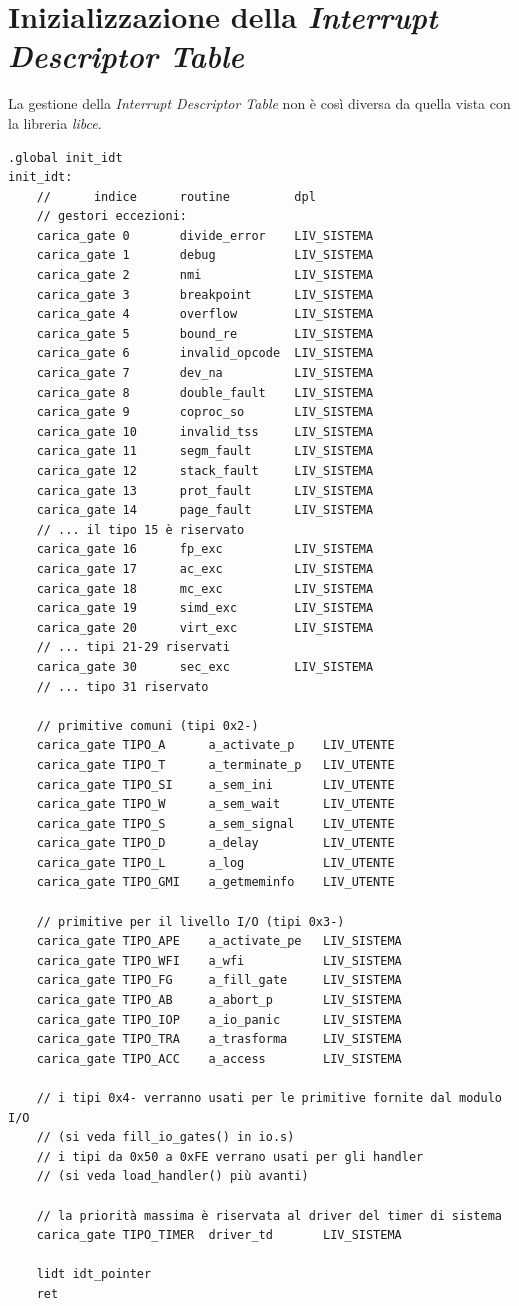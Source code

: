\documentclass[11pt]{report}
\theoremstyle{definition}
\begin{document}
\section{Inizializzazione della \emph{Interrupt Descriptor Table}}
La gestione della \emph{Interrupt Descriptor Table} non è così diversa da quella vista con la libreria \emph{libce}.
\small 
\begin{verbatim}
.global init_idt
init_idt:
    //      indice      routine         dpl
    // gestori eccezioni:
    carica_gate	0       divide_error    LIV_SISTEMA
    carica_gate	1       debug           LIV_SISTEMA
    carica_gate	2       nmi             LIV_SISTEMA
    carica_gate	3       breakpoint      LIV_SISTEMA
    carica_gate	4       overflow        LIV_SISTEMA
    carica_gate	5       bound_re        LIV_SISTEMA
    carica_gate	6       invalid_opcode  LIV_SISTEMA
    carica_gate	7       dev_na          LIV_SISTEMA
    carica_gate	8       double_fault    LIV_SISTEMA
    carica_gate	9       coproc_so       LIV_SISTEMA
    carica_gate	10      invalid_tss     LIV_SISTEMA
    carica_gate	11      segm_fault      LIV_SISTEMA
    carica_gate	12      stack_fault     LIV_SISTEMA
    carica_gate	13      prot_fault      LIV_SISTEMA
    carica_gate	14      page_fault      LIV_SISTEMA
    // ... il tipo 15 è riservato
    carica_gate	16      fp_exc          LIV_SISTEMA
    carica_gate	17      ac_exc          LIV_SISTEMA
    carica_gate	18      mc_exc          LIV_SISTEMA
    carica_gate	19      simd_exc        LIV_SISTEMA
    carica_gate	20      virt_exc        LIV_SISTEMA
    // ... tipi 21-29 riservati
    carica_gate	30      sec_exc         LIV_SISTEMA
    // ... tipo 31 riservato

    // primitive comuni (tipi 0x2-)
    carica_gate	TIPO_A      a_activate_p    LIV_UTENTE
    carica_gate	TIPO_T      a_terminate_p   LIV_UTENTE
    carica_gate	TIPO_SI     a_sem_ini       LIV_UTENTE
    carica_gate	TIPO_W      a_sem_wait      LIV_UTENTE
    carica_gate	TIPO_S      a_sem_signal    LIV_UTENTE
    carica_gate	TIPO_D      a_delay         LIV_UTENTE
    carica_gate	TIPO_L      a_log           LIV_UTENTE
    carica_gate	TIPO_GMI    a_getmeminfo    LIV_UTENTE

    // primitive per il livello I/O (tipi 0x3-) 
    carica_gate	TIPO_APE    a_activate_pe   LIV_SISTEMA
    carica_gate	TIPO_WFI    a_wfi           LIV_SISTEMA
    carica_gate	TIPO_FG     a_fill_gate     LIV_SISTEMA
    carica_gate	TIPO_AB     a_abort_p       LIV_SISTEMA
    carica_gate	TIPO_IOP    a_io_panic      LIV_SISTEMA
    carica_gate	TIPO_TRA    a_trasforma     LIV_SISTEMA
    carica_gate	TIPO_ACC    a_access        LIV_SISTEMA

    // i tipi 0x4- verranno usati per le primitive fornite dal modulo I/O
    // (si veda fill_io_gates() in io.s)
    // i tipi da 0x50 a 0xFE verrano usati per gli handler
    // (si veda load_handler() più avanti)

    // la priorità massima è riservata al driver del timer di sistema
    carica_gate	TIPO_TIMER  driver_td       LIV_SISTEMA

    lidt idt_pointer
    ret
\end{verbatim}
\end{document}

